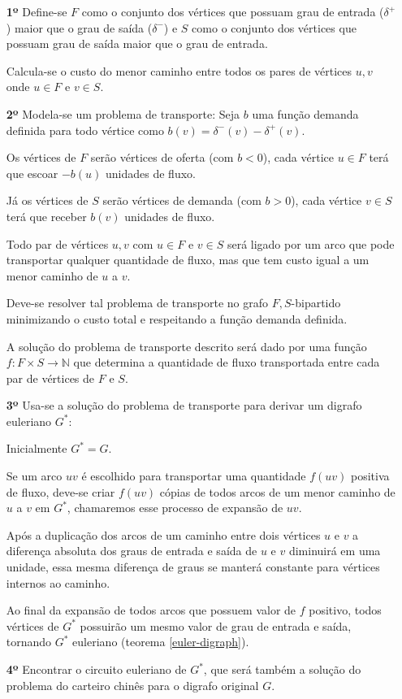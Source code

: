     \begin{enumerate}
        \item[\textbf{1º}] Define-se $F$ como o conjunto dos vértices que possuam grau de entrada ($\delta^+$) maior que o grau de saída ($\delta^-$) e $S$ como o conjunto dos vértices que possuam grau de saída maior que o grau de entrada.

        Calcula-se o custo do menor caminho entre todos os pares de vértices $u, v$ onde $u \in F$ e $v \in S$.

        \item[\textbf{2º}] Modela-se um problema de transporte: 
        Seja $b$ uma função demanda definida para todo vértice como $b(v) = \delta^-(v) - \delta^+(v)$.

        Os vértices de $F$ serão vértices de oferta (com $b < 0$), cada vértice $u \in F$ terá que escoar $-b(u)$ unidades de fluxo. 

        Já os vértices de $S$ serão vértices de demanda (com $b > 0$), cada vértice $v \in S$ terá que receber $b(v)$ unidades de fluxo.

        Todo par de vértices $u, v$ com $u \in F$ e $v \in S$ será ligado por um arco que pode transportar qualquer quantidade de fluxo, mas que tem custo igual a um menor caminho de $u$ a $v$.

        Deve-se resolver tal problema de transporte no grafo $F,S$-bipartido minimizando o custo total e respeitando a função demanda definida.

        A solução do problema de transporte descrito será dado por uma função $f: F\times S \rightarrow \mathbb{N}$ que determina a quantidade de fluxo transportada entre cada par de vértices de $F$ e $S$.

        \item[\textbf{3º}] Usa-se a solução do problema de transporte para derivar um digrafo euleriano $G^*$:

            Inicialmente $G^* = G$.

            Se um arco $uv$ é escolhido para transportar uma quantidade $f(uv)$ positiva de fluxo, deve-se criar $f(uv)$ cópias de todos arcos de um menor caminho de $u$ a $v$ em $G^*$, chamaremos esse processo de expansão de $uv$.

            Após a duplicação dos arcos de um caminho entre dois vértices $u$ e $v$ a diferença absoluta dos graus de entrada e saída de $u$ e $v$ diminuirá em uma unidade, essa mesma diferença de graus se manterá constante para vértices internos ao caminho. 

            Ao final da expansão de todos arcos que possuem valor de $f$ positivo, todos vértices de $G^*$ possuirão um mesmo valor de grau de entrada e saída, tornando $G^*$ euleriano (teorema \ref{euler-digraph}).

        \item[\textbf{4º}] Encontrar o circuito euleriano de $G^*$, que será também a solução do problema do carteiro chinês para o digrafo original $G$.

    \end{enumerate}


